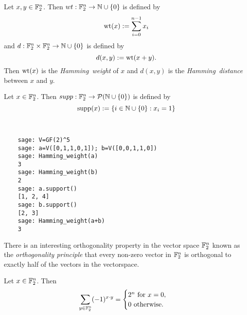 \begin{definition}\label{def:Hamming}
  Let $x,y\in\mathbb{F}_2^n$. Then $wt:\mathbb{F}_2^n\rightarrow\mathbb{N}\cup\{0\}$
  is defined by
  \[
    {\rm wt}(x):=\sum_{i=0}^{n-1}x_i
  \]
  and $d:\mathbb{F}_2^n\times\mathbb{F}_2^n\rightarrow\mathbb{N}\cup\{0\}$ is defined by
  \[
    d(x,y):={\rm wt}(x+y).
  \]
  Then ${\rm wt}(x)$ is the {\em Hamming\ weight} of $x$ and $d(x,y)$ is the
  {\em Hamming\ distance} between $x$ and $y$.
\end{definition}

\begin{definition}
\label{def:support}
  Let $x\in\mathbb{F}_2^n$. Then $supp:\mathbb{F}_2^n\rightarrow\allowbreak
  \mathcal{P}(\mathbb{N}\cup\{0\})$ is defined by
  \[
    {\rm supp}(x):=\{i\in\mathbb{N}\cup\{0\}:x_i=1\}
  \]
\end{definition}

\begin{example}
  \ 
  \begin{lstlisting}
    sage: V=GF(2)^5
    sage: a=V([0,1,1,0,1]); b=V([0,0,1,1,0])
    sage: Hamming_weight(a)
    3
    sage: Hamming_weight(b)
    2
    sage: a.support()
    [1, 2, 4]
    sage: b.support()
    [2, 3]
    sage: Hamming_weight(a+b)
    3
  \end{lstlisting}

\end{example}

\par There is an interesting orthogonality property in the vector space
$\mathbb{F}_2^n$ known as the {\em orthogonality principle} that every non-zero
vector in $\mathbb{F}_2^n$ is orthogonal to exactly half of the vectors in the
vectorspace.

\begin{proposition}
\label{prop:orthogonality-principle}
  Let $x\in\mathbb{F}_2^n$. Then
  \begin{equation*}
    \sum_{y\in\mathbb{F}_2^n}(-1)^{x\cdot y}=
    \begin{cases}
      2^n \text{ \rm for } x=0, \\
      0 \text{ \rm otherwise.}
    \end{cases}
  \end{equation*}
\end{proposition}

